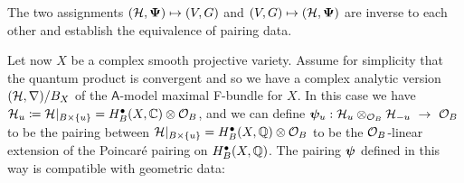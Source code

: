 \documentclass[twoside,leqno]{article}
\numberwithin{equation}{section}
\theoremstyle{plain}
\theoremstyle{definition}
\begin{document}
The two assignments $(\mathcal H,\boldsymbol{\Psi}) \mapsto (V,G)$ and $(V,G) \mapsto (\mathcal H,\boldsymbol{\Psi})$ are inverse to each other and 
establish the equivalence of pairing data. 

\medskip

Let now $X$ be a complex  smooth projective variety. Assume for simplicity that the quantum product is convergent and so we have a complex analytic version $(\mathcal H,\nabla)/B_{X}$ of the $\mathsf{A}$-model maximal F-bundle  for $X$. In this case we have $\mathcal H_{u} \coloneqq \mathcal H|_{B\times \{ u\}} = H^{\bullet}_{B}(X,\mathbb C)\otimes\mathcal O_{B}$, and 
we can define $\boldsymbol{\psi}_{u} : \mathcal H_{u}\otimes_{\mathcal O_{B}} \mathcal H_{-u}  \ \to \ \mathcal O_{B}$ to be the pairing between $\mathcal H|_{B\times\{u\}} = H^{\bullet}_{B}(X,\mathbb Q)\otimes \mathcal O_{B}$ to be the $\mathcal O_{B}$-linear extension of the Poincar\'{e} pairing on  $H^{\bullet}_{B}(X,\mathbb Q)$. The pairing $\boldsymbol{\psi}$ defined in this way is compatible with geometric data:
\end{document}
